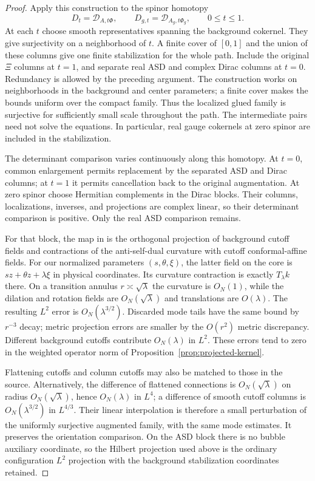 \documentclass[11pt]{amsart}
\theoremstyle{definition}
\theoremstyle{remark}
\theoremstyle{plain}
\begin{document}
\begin{proof}
Apply this construction to the spinor homotopy
\begin{equation}\label{eq:orientation-spinor-homotopy}
 D_t=\mathscr D_{A,t\Phi},\qquad
 D_{g,t}=\mathscr D_{A_g,t\Phi_g},\qquad 0\leq t\leq1.
\end{equation}
At each $t$ choose smooth representatives spanning the background
cokernel.  They give surjectivity on a neighborhood of $t$.
A finite cover of $[0,1]$ and the union of these columns give one
finite stabilization for the whole path.  Include the original
$\Xi$ columns at $t=1$, and separate real ASD and complex Dirac
columns at $t=0$.  Redundancy is allowed by the preceding argument.
The construction works on neighborhoods in the background and
center parameters; a finite cover makes the bounds uniform over
the compact family.  Thus the localized glued family is surjective
for sufficiently small scale throughout the path.
The intermediate pairs need not solve the equations.  In particular,
real gauge cokernels at zero spinor are included in the stabilization.

The determinant comparison varies continuously along this homotopy.
At $t=0$, common enlargement permits replacement by the separated
ASD and Dirac columns; at $t=1$ it permits cancellation back to the
original augmentation.  At zero spinor choose Hermitian complements
in the Dirac blocks.  Their columns, localizations, inverses, and
projections are complex linear, so their determinant comparison is
positive.  Only the real ASD comparison remains.

For that block, the map in
\cite[Section~3(d), Proposition~(3.20)]{DonaldsonOrientation} is the
orthogonal projection of background cutoff fields and contractions
of the anti-self-dual curvature with cutoff conformal-affine fields.
For our normalized parameters $(s,\theta,\xi)$, the latter field
on the core is $sz+\theta z+\lambda\xi$ in physical coordinates.
Its curvature contraction is exactly $T_\lambda k$ there.
On a transition annulus $r\asymp\sqrt\lambda$ the curvature is
$O_N(1)$, while the dilation and rotation fields are
$O_N(\sqrt\lambda)$ and translations are $O(\lambda)$.
The resulting $L^2$ error is $O_N(\lambda^{3/2})$.
Discarded mode tails have the same bound by $r^{-3}$ decay;
metric projection errors are smaller by the $O(r^2)$ metric
discrepancy.  Different background cutoffs contribute $O_N(\lambda)$
in $L^2$.  These errors tend to zero in the weighted operator norm
of Proposition~\ref{prop:projected-kernel}.

Flattening cutoffs and column cutoffs may also be matched to those
in the source.  Alternatively, the difference of flattened connections
is $O_N(\sqrt\lambda)$ on radius $O_N(\sqrt\lambda)$, hence
$O_N(\lambda)$ in $L^4$; a difference of smooth cutoff columns is
$O_N(\lambda^{3/2})$ in $L^{4/3}$.  Their linear interpolation
is therefore a small perturbation of the uniformly surjective
augmented family, with the same mode estimates.  It preserves the
orientation comparison.  On the ASD block there is no bubble
auxiliary coordinate, so the Hilbert projection used above is the
ordinary configuration $L^2$ projection with the background
stabilization coordinates retained.


\end{proof}
\end{document}
